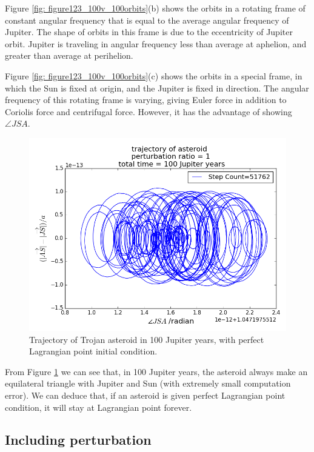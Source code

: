 \documentclass[12pt,a4paper]{article}
\begin{document}
Figure \ref{fig: figure123_100v_100orbits}(b) shows the orbits in a rotating frame of constant angular frequency that is equal to the average angular frequency of Jupiter. The shape of orbits in this frame is due to the eccentricity of Jupiter orbit. Jupiter is traveling in angular frequency less than average at aphelion, and greater than average at perihelion.

Figure \ref{fig: figure123_100v_100orbits}(c) shows the orbits in a special frame, in which the Sun is fixed at origin, and the Jupiter is fixed in direction. The angular frequency of this rotating frame is varying, giving Euler force in addition to Coriolis force and centrifugal force. However, it has the advantage of showing $\angle JSA$.


\begin{figure}[H]
\centering
\includegraphics[width = 5 in]{figure_5_100v_100orbits.png}
\caption{Trajectory of Trojan asteroid in 100 Jupiter years, with perfect Lagrangian point initial condition.}  
\label{fig: figure5_100v_100orbits}
\end{figure}


From Figure \ref{fig: figure5_100v_100orbits} we can see that, in 100 Jupiter years, the asteroid always make an equilateral triangle with Jupiter and Sun (with extremely small computation error). We can deduce that, if an asteroid is given perfect Lagrangian point condition, it will stay at Lagrangian point forever.

\subsection{Including perturbation}
\end{document}
